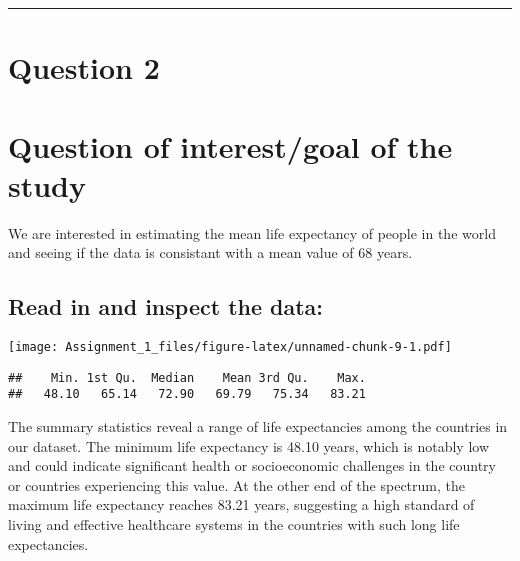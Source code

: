 \documentclass[
]{article}
\newenvironment{Shaded}{\begin{snugshade}}{\end{snugshade}}
\newcommand{\AttributeTok}[1]{\textcolor[rgb]{0.13,0.29,0.53}{#1}}
\newcommand{\FunctionTok}[1]{\textcolor[rgb]{0.13,0.29,0.53}{\textbf{#1}}}
\newcommand{\NormalTok}[1]{#1}
\newcommand{\OtherTok}[1]{\textcolor[rgb]{0.56,0.35,0.01}{#1}}
\newcommand{\SpecialCharTok}[1]{\textcolor[rgb]{0.81,0.36,0.00}{\textbf{#1}}}
\newcommand{\StringTok}[1]{\textcolor[rgb]{0.31,0.60,0.02}{#1}}
\begin{document}
\begin{center}\rule{0.5\linewidth}{0.5pt}\end{center}

\section{Question 2}\label{question-2}

\section{Question of interest/goal of the
study}\label{question-of-interestgoal-of-the-study-1}

We are interested in estimating the mean life expectancy of people in
the world and seeing if the data is consistant with a mean value of 68
years.

\subsection{Read in and inspect the
data:}\label{read-in-and-inspect-the-data-1}

\begin{Shaded}
\end{Shaded}

\texttt{[image: Assignment\_1\_files/figure-latex/unnamed-chunk-9-1.pdf]}

\begin{Shaded}
\end{Shaded}

\begin{verbatim}
##    Min. 1st Qu.  Median    Mean 3rd Qu.    Max. 
##   48.10   65.14   72.90   69.79   75.34   83.21
\end{verbatim}

The summary statistics reveal a range of life expectancies among the
countries in our dataset. The minimum life expectancy is 48.10 years,
which is notably low and could indicate significant health or
socioeconomic challenges in the country or countries experiencing this
value. At the other end of the spectrum, the maximum life expectancy
reaches 83.21 years, suggesting a high standard of living and effective
healthcare systems in the countries with such long life expectancies.
\end{document}
